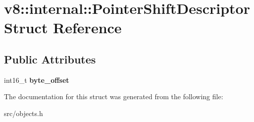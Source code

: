 \hypertarget{structv8_1_1internal_1_1_pointer_shift_descriptor}{}\section{v8\+:\+:internal\+:\+:Pointer\+Shift\+Descriptor Struct Reference}
\label{structv8_1_1internal_1_1_pointer_shift_descriptor}
\subsection*{Public Attributes}
\begin{DoxyCompactItemize}
\item 
\hypertarget{structv8_1_1internal_1_1_pointer_shift_descriptor_a3769e1e3887f6a280fcdedfea1d209f8}{}int16\+\_\+t {\bfseries byte\+\_\+offset}\label{structv8_1_1internal_1_1_pointer_shift_descriptor_a3769e1e3887f6a280fcdedfea1d209f8}

\end{DoxyCompactItemize}


The documentation for this struct was generated from the following file\+:\begin{DoxyCompactItemize}
\item 
src/objects.\+h\end{DoxyCompactItemize}
